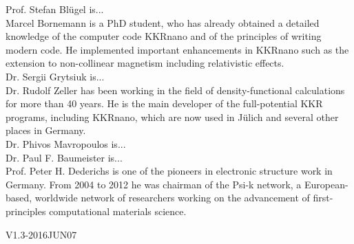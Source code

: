 \documentclass [a4paper, 12pt]{article}
\begin{document}
Prof. Stefan Bl{\"u}gel is...
\\
Marcel Bornemann is a PhD student, who has already
obtained a detailed knowledge of the computer code KKRnano and of the principles of writing modern code. 
He implemented important enhancements in KKRnano such as the extension to non-collinear
magnetism including relativistic effects.
\\
Dr. Sergii Grytsiuk is...
\\
Dr. Rudolf Zeller has been working in the field of density-functional calculations for more than 40 years. 
He is the main developer of the full-potential KKR programs, including KKRnano, 
which are now used in J{\"u}lich and several other places in Germany. 
\\
Dr. Phivos Mavropoulos is...
\\
Dr. Paul F. Baumeister is...
\\
Prof. Peter H. Dederichs is one of the pioneers in electronic structure work in Germany.
From 2004 to 2012 he was chairman of the Psi-k network, a European-based, worldwide network 
of researchers working on the advancement of first-principles computational materials science.
\newpage




\bigskip
\begin{flushright}
{\tiny V1.3-2016JUN07}
\end{flushright}
\end{document}
